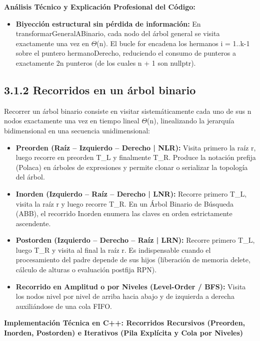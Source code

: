 \documentclass[11pt,letterpaper]{article}
\begin{document}
\noindent\textbf{\color{ipnguinda}Análisis Técnico y Explicación Profesional del Código:}\par\vspace{-2pt}
\begin{itemize}
\setlength{\itemsep}{2pt}\setlength{\parskip}{0pt}
  \item \textbf{Biyección estructural sin pérdida de información: }En transformarGeneralABinario, cada nodo del árbol general se visita exactamente una vez en $\Theta$(n). El bucle for encadena los hermanos i = 1..k-1 sobre el puntero hermanoDerecho, reduciendo el consumo de punteros a exactamente 2n punteros (de los cuales n + 1 son nullptr).
\end{itemize}
\subsection*{3.1.2 Recorridos en un árbol binario}
Recorrer un árbol binario consiste en visitar sistemáticamente cada uno de sus n nodos exactamente una vez en tiempo lineal $\Theta$(n), linealizando la jerarquía bidimensional en una secuencia unidimensional:\par
\begin{itemize}
\setlength{\itemsep}{2pt}\setlength{\parskip}{0pt}
  \item \textbf{Preorden (Raíz – Izquierdo – Derecho | NLR): }Visita primero la raíz r, luego recorre en preorden T\_L y finalmente T\_R. Produce la notación prefija (Polaca) en árboles de expresiones y permite clonar o serializar la topología del árbol.
  \item \textbf{Inorden (Izquierdo – Raíz – Derecho | LNR): }Recorre primero T\_L, visita la raíz r y luego recorre T\_R. En un Árbol Binario de Búsqueda (ABB), el recorrido Inorden enumera las claves en orden estrictamente ascendente.
  \item \textbf{Postorden (Izquierdo – Derecho – Raíz | LRN): }Recorre primero T\_L, luego T\_R y visita al final la raíz r. Es indispensable cuando el procesamiento del padre depende de sus hijos (liberación de memoria delete, cálculo de alturas o evaluación postfija RPN).
  \item \textbf{Recorrido en Amplitud o por Niveles (Level-Order / BFS): }Visita los nodos nivel por nivel de arriba hacia abajo y de izquierda a derecha auxiliándose de una cola FIFO.
\end{itemize}
\vspace{4pt}\noindent\textbf{\color{ipnblue}Implementación Técnica en C++: Recorridos Recursivos (Preorden, Inorden, Postorden) e Iterativos (Pila Explícita y Cola por Niveles)}\par\vspace{-2pt}
\end{document}
